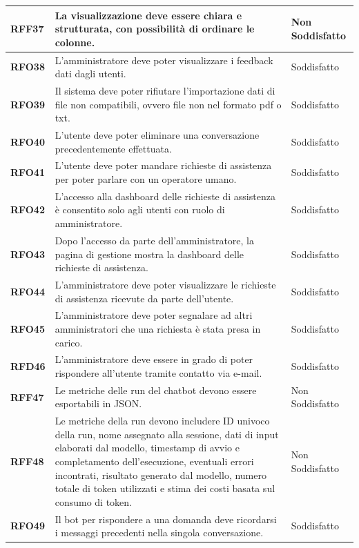 \begin{longtable}{|>{\centering\arraybackslash}m{}|>{\centering\arraybackslash}m{}|>{\centering\arraybackslash}m{}|}
    \hline
    \textbf{RFF37} & La visualizzazione deve essere chiara e strutturata, con possibilità di ordinare le colonne. & Non Soddisfatto \\
    \hline
    \textbf{RFO38} & L'amministratore deve poter visualizzare i feedback dati dagli utenti. & Soddisfatto \\
    \hline
    \textbf{RFO39} & Il sistema deve poter rifiutare l'importazione dati di file non compatibili, ovvero file non nel formato pdf o txt. & Soddisfatto \\
    \hline
    \textbf{RFO40} & L'utente deve poter eliminare una conversazione precedentemente effettuata. & Soddisfatto \\
    \hline
    \textbf{RFO41} & L'utente deve poter mandare richieste di assistenza per poter parlare con un operatore umano. & Soddisfatto \\
    \hline
    \textbf{RFO42} & L’accesso alla dashboard delle richieste di assistenza è consentito solo agli utenti con ruolo di amministratore. & Soddisfatto \\
    \hline
    \textbf{RFO43} & Dopo l’accesso da parte dell'amministratore, la pagina di gestione mostra la dashboard delle richieste di assistenza. & Soddisfatto \\
    \hline
    \textbf{RFO44} & L'amministratore deve poter visualizzare le richieste di assistenza ricevute da parte dell'utente. & Soddisfatto \\
    \hline
    \textbf{RFO45} & L'amministratore deve poter segnalare ad altri amministratori che una richiesta è stata presa in carico. & Soddisfatto \\
    \hline
    \textbf{RFD46} & L'amministratore deve essere in grado di poter rispondere all'utente tramite contatto via e-mail. & Soddisfatto \\
    \hline
    \textbf{RFF47} & Le metriche delle run del chatbot devono essere esportabili in JSON. & Non Soddisfatto \\
    \hline
    \textbf{RFF48} & Le metriche della run devono includere ID univoco della run, nome assegnato alla sessione, dati di input elaborati dal modello, timestamp di avvio e completamento dell'esecuzione, eventuali errori incontrati, risultato generato dal modello, numero totale di token utilizzati e stima dei costi basata sul consumo di token. & Non Soddisfatto \\
    \hline
    \textbf{RFO49} & Il bot per rispondere a una domanda deve ricordarsi i messaggi precedenti nella singola conversazione. & Soddisfatto \\

\end{longtable}

